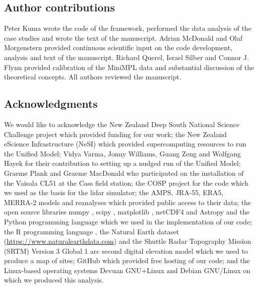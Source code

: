 \subsection*{Author contributions}

Peter Kuma wrote the code of the framework, performed the data analysis
of the case studies and wrote the text of the manuscript. Adrian McDonald and
Olaf Morgenstern provided continuous scientific input on the code development,
analysis and text of the manuscript. Richard Querel, Israel Silber and Connor
J. Flynn provided calibration of the MiniMPL data and substantial discussion
of the theoretical concepts. All authors reviewed the manuscript.

\subsection*{Acknowledgments}

We would like to acknowledge the New Zealand Deep South National Science Challenge 
project which provided funding for our work; the New Zealand eScience
Infrastructure (NeSI) which provided supercomputing resources to run the Unified
Model; Vidya Varma, Jonny Williams, Guang Zeng and Wolfgang Hayek for their
contribution to setting up a nudged run of the Unified Model;
Graeme Plank and Graeme MacDonald who participated on the installation of
the Vaisala CL51 at the Cass field station; the COSP project for the code which
we used as the basis for the lidar simulator; the AMPS, JRA-55, ERA5, MERRA-2
models and reanalyses which provided public access to their data; the open source libraries numpy \citep{derwalt2011}, scipy \citep{scipy2019}, matplotlib \citep{hunter2007}, netCDF4 \citep{rew1990} and Astropy \citep{astropy2018} and the
Python programming language \citep{rossum1995} which we used in the
implementation of our code; the R programming language \citep{r2017}, the Natural Earth
dataset (\url{https://www.naturalearthdata.com}) and the Shuttle Radar Topography Mission (SRTM) Version 3 Global 1 arc second digital elevation model \citep{werner2001,srtm}
which we used to produce a map of sites; GitHub which provided free hosting
of our code; and the Linux-based \citep{torvalds1997} operating systems
Devuan GNU+Linux and Debian GNU/Linux on which we produced this analysis.

\normalsize

\clearpage

